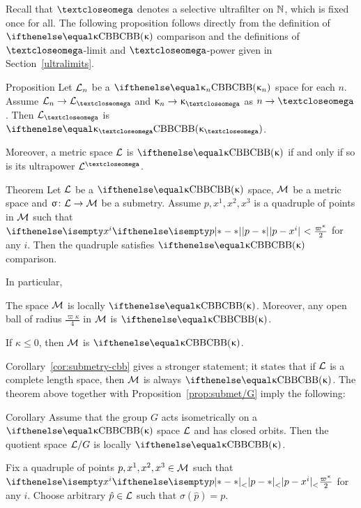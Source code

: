 Recall that $\o$ denotes a selective ultrafilter on $\mathbb{N}$, which is fixed once for all.
The following proposition follows directly from the definition of $\Alex\kappa$ comparison and the definitions of $\o$-limit and $\o$-power given in Section~\ref{ultralimits}.


\begin{thm}{Proposition}\label{prp:A^omega}
Let $\mathcal{L}_n$ be a $\Alex{\kappa_n}$ space for each $n$.
Assume $\spc{L}_n\to \spc{L}_\o$ 
and $\kappa_n\to\kappa_\o$ as $n\to\o$.
Then $\spc{L}_\o$ is $\Alex{\kappa_\o}$.

Moreover, a metric space $\mathcal{L}$ is $\Alex\kappa$ if and only if so is
its ultrapower $\spc{L}^\o$.
\end{thm}

\begin{thm}{Theorem}\label{thm:submetry-CBB}
Let $\mathcal{L}$ be a $\Alex{\kappa}$ space, $\mathcal{M}$ be a metric space and $\sigma\:\spc{L}\to\spc{M}$ be a submetry.
Assume $p,x^1,x^2,x^3$ is a quadruple of points in $\mathcal{M}$ such that 
$\dist{p}{x^i}{}<\tfrac{\varpi\kappa}2$ for any $i$.
Then the  quadruple satisfies $\Alex{\kappa}$ comparison.

In particular, 
\begin{subthm}{}
The space $\mathcal{M}$ is locally $\Alex{\kappa}$.
Moreover, any open ball of radius $\tfrac{\varpi\kappa}4$ in $\mathcal{M}$ is $\Alex{\kappa}$.
\end{subthm}

\begin{subthm}{}
If $\kappa\le 0$, then  $\mathcal{M}$ is $\Alex{\kappa}$.
\end{subthm}
\end{thm}

Corollary~\ref{cor:submetry-cbb} gives a stronger statement; it states that if $\mathcal{L}$ is a complete length space, then $\mathcal{M}$ is always $\Alex{\kappa}$.
The theorem above together with Proposition~\ref{prop:submet/G}
imply the following:

\begin{thm}{Corollary}\label{thm:CBB/G}
Assume that  the group $G$ acts isometrically on a $\Alex{\kappa}$ space $\mathcal{L}$ and has  closed orbits.
Then the quotient space $\mathcal{L}/G$ is locally $\Alex\kappa$. 
\end{thm}

Fix a quadruple of points $p,x^1,x^2,x^3\in \spc{M}$ such that 
$\dist{p}{x^i}<\tfrac{\varpi\kappa}2$ for any $i$.
Choose arbitrary $\hat p\in \spc{L}$ such that $\sigma(\hat{p})=p$.

